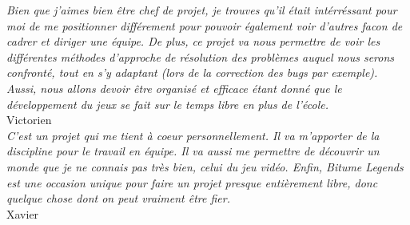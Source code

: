 \documentclass[11pt,a4paper]{article}
\begin{document}
  \textit{Bien que j'aimes bien être chef de projet, je trouves qu'il était intérréssant 
    pour moi de me positionner différement pour pouvoir également voir d'autres facon 
    de cadrer et diriger une équipe. De plus, ce projet va nous permettre de voir les différentes
    méthodes d'approche de résolution des problèmes auquel nous serons confronté, tout en s'y
    adaptant (lors de la correction des bugs par exemple). Aussi, nous allons devoir être organisé
    et efficace étant donné que le développement du jeux se fait sur le temps libre en plus de l'école.}\\
  \indent Victorien\\

  \textit{C'est un projet qui me tient à coeur personnellement. Il va m'apporter de la discipline pour le travail
    en équipe. Il va aussi me permettre de découvrir un monde que je ne connais pas très bien, celui du jeu vidéo.
    Enfin, Bitume Legends est une occasion unique pour faire un projet presque entièrement libre, donc quelque
    chose dont on peut vraiment être fier.}\\
  \indent Xavier
\clearpage
\end{document}
